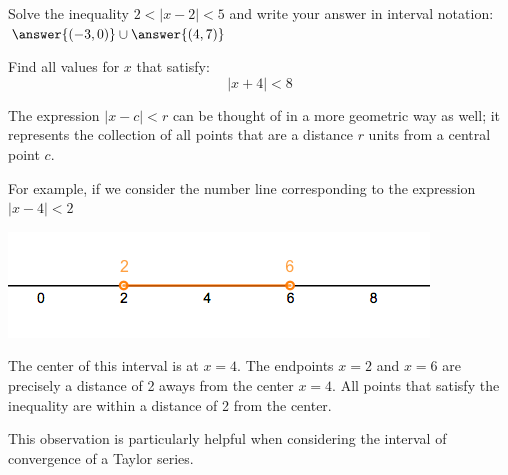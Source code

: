 \documentclass{ximera}
\begin{document}
\begin{problem}
  Solve the inequality $2 < |x - 2| < 5$ and write your answer in interval notation: $\answer{(-3, 0)} \cup \answer{(4, 7)}$
  
\end{problem}

\begin{problem}
  Find all values for $x$ that satisfy:
  \[
    |x + 4| < 8
  \]
  \begin{multipleChoice}
  \end{multipleChoice}
\end{problem}

\begin{problem}
  The expression $|x - c| < r$ can be thought of in a more geometric way as well; it represents the collection of all points that are a distance $r$ units from a central point $c$.
  
  For example, if we consider the number line corresponding to the expression $|x - 4| < 2$
\begin{image}
  \includegraphics[scale = 0.5]{inequalitiesImages/ineqProblem-10-Fig}
\end{image}
  The center of this interval is at $x = 4$.
  The endpoints $x = 2$ and $x = 6$ are precisely a distance of 2 aways from the center $x = 4$. 
  All points that satisfy the inequality are within a distance of 2 from the center.
  
  This observation is particularly helpful when considering the interval of convergence of a Taylor series.
  \begin{multipleChoice}
  \end{multipleChoice}
\end{problem}
\end{document}
